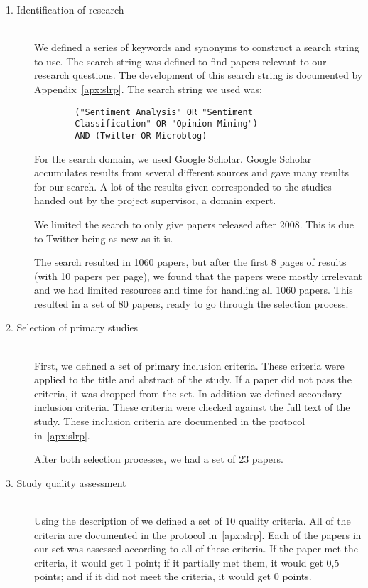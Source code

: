 \begin{description}

	\item[1. Identification of research] \hfill \\
		We defined a series of keywords and synonyms to construct a search string to use. The search string was defined to find papers relevant to our research questions. The development of this search string is documented by Appendix~\ref{apx:slrp}. The search string we used was:
		
		\begin{verbatim}
		("Sentiment Analysis" OR "Sentiment 
		Classification" OR "Opinion Mining") 
		AND (Twitter OR Microblog)
		\end{verbatim}

		For the search domain, we used Google Scholar. Google Scholar accumulates results from several different sources and gave many results for our search. A lot of the results given corresponded to the studies handed out by the project supervisor, a domain expert. 
		
		We limited the search to only give papers released after 2008. This is due to Twitter being as new as it is.
		
		The search resulted in 1060 papers, but after the first 8 pages of results (with 10 papers per page), we found that the papers were mostly irrelevant and we had limited resources and time for handling all 1060 papers. This resulted in a set of 80 papers, ready to go through the selection process.
		
		

	\item[2. Selection of primary studies] \hfill \\
		First, we defined a set of primary inclusion criteria. These criteria were applied to the title and abstract of the study. If a paper did not pass the criteria, it was dropped from the set. In addition we defined secondary inclusion criteria. These criteria were checked against the full text of the study. These inclusion criteria are documented in the protocol in~\autoref{apx:slrp}. 
		
		After both selection processes, we had a set of 23 papers. 

	\item[3. Study quality assessment] \hfill \\
		Using the description of \cite{paper:slrdesc} we defined a set of 10 quality criteria. All of the criteria are documented in the protocol in~\autoref{apx:slrp}. Each of the papers in our set was assessed according to all of these criteria. If the paper met the criteria, it would get 1 point; if it partially met them, it would get 0,5 points; and if it did not meet the criteria, it would get 0 points. 
		

\end{description}
